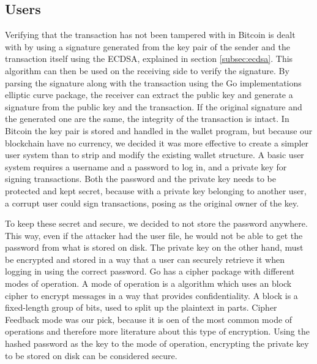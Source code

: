 \documentclass[12pt]{article}
\begin{document}
\subsection{Users}

Verifying that the transaction has not been tampered with in Bitcoin is dealt with by using a signature generated from the key pair of the sender and the transaction itself using the ECDSA, explained in section \ref{subsec:ecdsa}. This algorithm can then be used on the receiving side to verify the signature. By parsing the signature along with the transaction using the Go implementations elliptic curve package, the receiver can extract the public key and generate a signature from the public key and the transaction. If the original signature and the generated one are the same, the integrity of the transaction is intact. In Bitcoin the key pair is stored and handled in the wallet program, but because our blockchain have no currency, we decided it was more effective to create a simpler user system than to strip and modify the existing wallet structure. A basic user system requires a username and a password to log in, and a private key for signing transactions. Both the password and the private key needs to be protected and kept secret, because with a private key belonging to another user, a corrupt user could sign transactions, posing as the original owner of the key. 

To keep these secret and secure, we decided to not store the password anywhere. This way, even if the attacker had the user file, he would not be able to get the password from what is stored on disk. The private key on the other hand, must be encrypted and stored in a way that a user can securely retrieve it when logging in using the correct password. Go has a cipher package with different modes of operation. A mode of operation is a algorithm which uses an block cipher to encrypt messages in a way that provides confidentiality\cite{fergusonblock}. A block is a fixed-length group of bits, used to split up the plaintext in parts. Cipher Feedback mode was our pick, because it is oen of the most common mode of operations and therefore more literature about this type of encryption. Using the hashed password as the key to the mode of operation, encrypting the private key to be stored on disk can be considered secure. 
\end{document}
